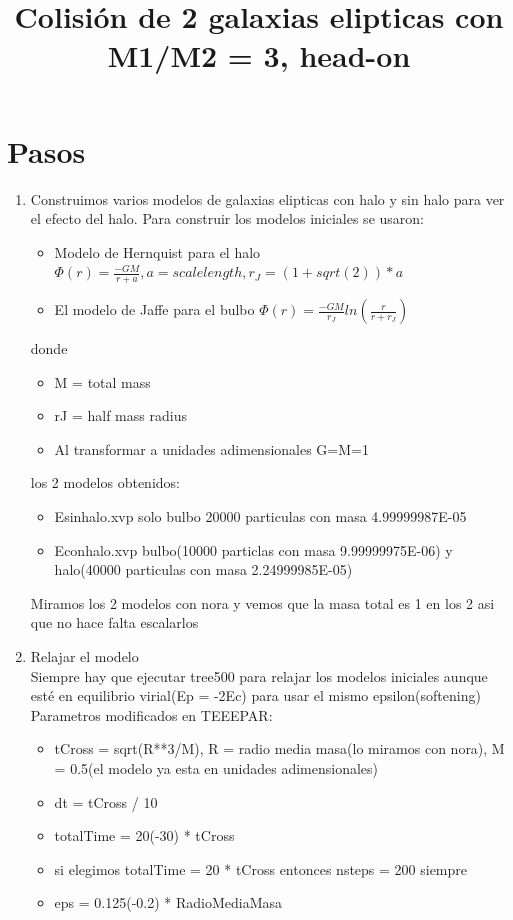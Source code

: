 \documentclass[12pt]{book}
\title{Colisión de 2 galaxias elipticas con M1/M2 = 3, head-on}
\begin{document}
\section*{Pasos}
\begin{enumerate}


\item Construimos varios modelos de galaxias elipticas con halo y sin halo para ver el efecto del halo.
Para construir los  modelos iniciales se usaron: 
\begin{itemize}
\item Modelo de Hernquist para el halo
$\Phi(r) = \frac{-GM}{r + a}, a = scale length, r_J = (1 + sqrt(2))*a $ \\

\item El modelo de Jaffe para el bulbo
$\Phi(r) = \frac{-G M }{r_J}  ln(\frac{r} {r + r_J})$\\
\end{itemize}
donde
\begin{itemize}
\item M = total mass 
\item rJ = half mass radius
\item Al transformar a unidades adimensionales G=M=1
\end{itemize}
los 2 modelos obtenidos:
\begin{itemize}
\item Esinhalo.xvp solo bulbo 20000 particulas con masa  4.99999987E-05
\item Econhalo.xvp bulbo(10000 particlas con masa 9.99999975E-06) y halo(40000 particulas con masa 2.24999985E-05)
\end{itemize}

Miramos los 2 modelos con nora y vemos que la masa total es 1 en los 2 asi que no hace falta escalarlos

\item Relajar el modelo \\
Siempre hay que ejecutar tree500 para relajar los modelos iniciales
aunque esté en equilibrio virial(Ep = -2Ec) para usar el mismo epsilon(softening)\\
Parametros modificados en TEEEPAR:
\begin{itemize}
\item tCross = sqrt(R**3/M), R = radio media masa(lo miramos con nora), M = 0.5(el modelo ya esta en unidades adimensionales)
\item dt = tCross / 10
\item totalTime = 20(-30) * tCross
\item si elegimos totalTime = 20 * tCross entonces nsteps = 200 siempre
\item eps = 0.125(-0.2) * RadioMediaMasa
\end{itemize}



\end{enumerate}
\end{document}
